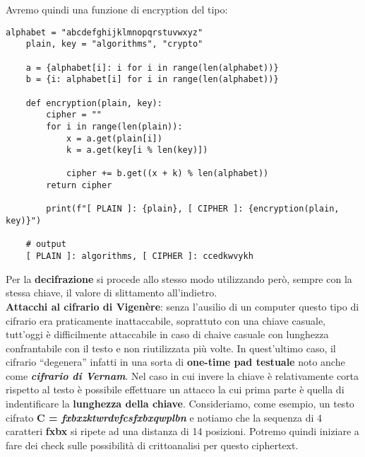 Avremo quindi una funzione di encryption del tipo:
\begin{lstlisting}[label=lst:enc-vigenere, basicstyle=\small]
    alphabet = "abcdefghijklmnopqrstuvwxyz"
    plain, key = "algorithms", "crypto"

    a = {alphabet[i]: i for i in range(len(alphabet))}
    b = {i: alphabet[i] for i in range(len(alphabet))}

    def encryption(plain, key):
        cipher = ""
        for i in range(len(plain)):
            x = a.get(plain[i])
            k = a.get(key[i % len(key)])
            
            cipher += b.get((x + k) % len(alphabet))
        return cipher

        print(f"[ PLAIN ]: {plain}, [ CIPHER ]: {encryption(plain, key)}")

    # output
    [ PLAIN ]: algorithms, [ CIPHER ]: ccedkwvykh
\end{lstlisting}

Per la \textbf{decifrazione} si procede allo stesso modo utilizzando però, sempre con la stessa chiave, il valore di slittamento all'indietro.
\\ \newline
\textbf{Attacchi al cifrario di Vigenère}: senza l'ausilio di un computer questo tipo di cifrario era praticamente inattaccabile, soprattuto con una chiave casuale, tutt'oggi è difficilmente attaccabile in caso di chaive casuale con lunghezza confrantabile con il testo e non riutilizzata più volte. In quest'ultimo caso, il cifrario ``degenera'' infatti in una sorta di \textbf{one-time pad testuale} noto anche come \textbf{\textit{cifrario di Vernam}}. Nel caso in cui invere la chiave è relativamente corta rispetto al testo è possibile effettuare un attacco la cui prima parte è quella di indentificare la \textbf{lunghezza della chiave}.
\newline
Consideriamo, come esempio, un testo cifrato \textbf{C = \textit{fxbxzktwrdvfcsfxbxqwplbn}} e notiamo che la sequenza di 4 caratteri \textbf{fxbx} si ripete ad una distanza di 14 posizioni. Potremo quindi iniziare a fare dei check sulle possibilità di crittoanalisi per questo ciphertext.
\\ \newline
{}%

